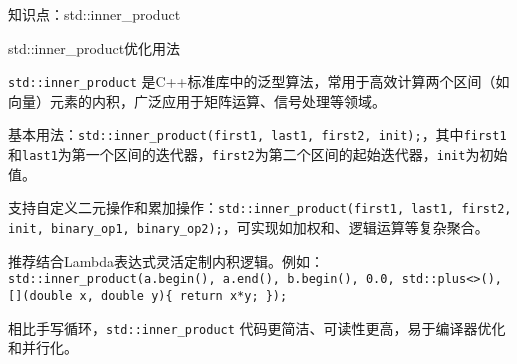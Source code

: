 \documentclass[UTF8,aspectratio=169]{beamer}
\begin{document}
\begin{frame}{知识点：std::inner\_product}
    \begin{ytublock}{std::inner\_product优化用法}
        \item \texttt{std::inner\_product} 是C++标准库中的泛型算法，常用于高效计算两个区间（如向量）元素的内积，广泛应用于矩阵运算、信号处理等领域。
        \item 基本用法：\texttt{std::inner\_product(first1, last1, first2, init);}，其中\texttt{first1}和\texttt{last1}为第一个区间的迭代器，\texttt{first2}为第二个区间的起始迭代器，\texttt{init}为初始值。
        \item 支持自定义二元操作和累加操作：\texttt{std::inner\_product(first1, last1, first2, init, binary\_op1, binary\_op2);}，可实现如加权和、逻辑运算等复杂聚合。
        \item 推荐结合Lambda表达式灵活定制内积逻辑。例如：\texttt{std::inner\_product(a.begin(), a.end(), b.begin(), 0.0, std::plus<>(), [](double x, double y)\{ return x*y; \});}
        \item 相比手写循环，\texttt{std::inner\_product} 代码更简洁、可读性更高，易于编译器优化和并行化。
    \end{ytublock}
\end{frame}
\end{document}
